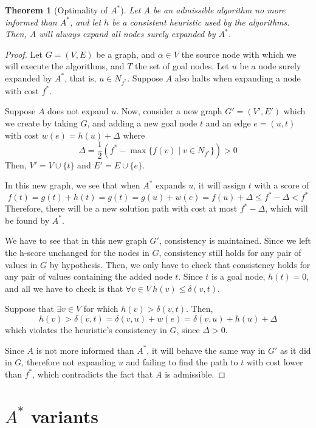 \documentclass[12pt]{report}
\newtheorem{theorem}{Theorem}[chapter]
\begin{document}
\begin{theorem}[Optimality of $A^*$]
Let $A$ be an admissible algorithm no more informed than $A^*$, and let $h$ be a consistent heuristic used by the algorithms. Then, $A$ will always expand all nodes surely expanded by $A^*$.
\end{theorem}
\begin{proof}
Let $G = (V, E)$ be a graph, and $\alpha \in V$ the source node with which we will execute the algorithms, and $T$ the set of goal nodes. Let $u$ be a node surely expanded by $A^*$, that is, $u \in N_{f^*}$. Suppose $A$ also halts when expanding a node with cost $f^*$.

Suppose $A$ does not expand $u$. Now, consider a new graph $G' = (V', E')$ which we create by taking $G$, and adding a new goal node $t$ and an edge $e = (u, t)$ with cost $w(e) = h(u) + \Delta$ where
\[ \Delta = \frac{1}{2} (f^* - \max \{ f(v) \mid v \in N_{f^*} \}) > 0 \]
Then, $V' = V \cup \{ t 	\}$ and $E' = E \cup \{ e \}$.

In this new graph, we see that when $A^*$ expands $u$, it will assign $t$ with a score of
\[ f(t) = g(t) + h(t) = g(t) = g(u) + w(e) = f(u) + \Delta \leq f^* - \Delta < f^* \]
Therefore, there will be a new solution path with cost at most $f^* - \Delta$, which will be found by $A^*$.

We have to see that in this new graph $G'$, consistency is maintained. Since we left the h-score unchanged for the nodes in $G$, consistency still holds for any pair of values in $G$ by hypothesis. Then, we only have to check that consistency holds for any pair of values containing the added node $t$. Since $t$ is a goal node, $h(t) = 0$, and all we have to check is that $\forall v \in V \  h(v) \leq \delta(v, t)$.

Suppose that $\exists v \in V$ for which $h(v) > \delta(v, t)$. Then,
\[ h(v) > \delta(v, t) = \delta(v, u) + w(e) = \delta(v, u) + h(u) + \Delta \]
which violates the heuristic's consistency in $G$, since $\Delta > 0$.

Since $A$ is not more informed than $A^*$, it will behave the same way in $G'$ as it did in $G$, therefore not expanding $u$ and failing to find the path to $t$ with cost lower than $f^*$, which contradicts the fact that $A$ is admissible.
\end{proof}


\chapter{$A^*$ variants}
\end{document}
